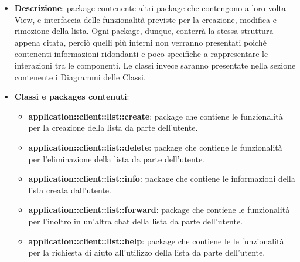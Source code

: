 \begin{itemize}
\item \textbf{Descrizione}: package contenente altri package che contengono a loro volta View,  e interfaccia delle funzionalità previste per la creazione, modifica e rimozione della lista. Ogni package, dunque, conterrà la stessa struttura appena citata, perciò quelli più interni non verranno presentati poiché contenenti informazioni ridondanti e poco specifiche a rappresentare le interazioni tra le componenti. Le classi invece saranno presentate nella sezione contenente i Diagrammi delle Classi.
	\item \textbf{Classi e packages contenuti}:
	\begin{itemize}
	\item \textbf{application::client::list::create}: package che contiene le funzionalità per la creazione della lista da parte dell'utente.
	\item \textbf{application::client::list::delete}: package che contiene le funzionalità per l'eliminazione della lista da parte dell'utente.
	\item \textbf{application::client::list::info}: package che contiene le informazioni della lista creata dall'utente.
	\item \textbf{application::client::list::forward}: package che contiene le funzionalità per l'inoltro in un'altra chat della lista da parte dell'utente.
	\item \textbf{application::client::list::help}: package che contiene le le funzionalità per la richiesta di aiuto all'utilizzo della lista da parte dell'utente.
	\end{itemize}
\end{itemize}


